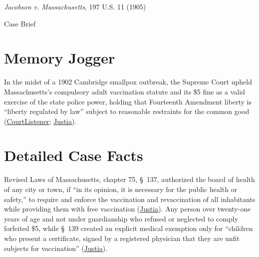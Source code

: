 \documentclass[12pt]{article}
\begin{document}
\begin{center}
{\LARGE \textit{Jacobson v. Massachusetts}, 197 U.S. 11 (1905)\par}
\vspace{0.8em}
{\large Case Brief\par}
\end{center}
\vspace{1em}

\section{Memory Jogger}

In the midst of a 1902 Cambridge smallpox outbreak, the Supreme Court upheld Massachusetts's compulsory adult vaccination statute and its \$5 fine as a valid exercise of the state police power, holding that Fourteenth Amendment liberty is ``liberty regulated by law'' subject to reasonable restraints for the common good (\href{https://www.courtlistener.com/opinion/96230/jacobson-v-massachusetts/}{CourtListener}; \href{https://supreme.justia.com/cases/federal/us/197/11/}{Justia}).

\section{Detailed Case Facts}

Revised Laws of Massachusetts, chapter 75, \S~137, authorized the board of health of any city or town, if ``in its opinion, it is necessary for the public health or safety,'' to require and enforce the vaccination and revaccination of all inhabitants while providing them with free vaccination (\href{https://supreme.justia.com/cases/federal/us/197/11/}{Justia}). Any person over twenty-one years of age and not under guardianship who refused or neglected to comply forfeited \$5, while \S~139 created an explicit medical exemption only for ``children who present a certificate, signed by a registered physician that they are unfit subjects for vaccination'' (\href{https://supreme.justia.com/cases/federal/us/197/11/}{Justia}).
\end{document}
